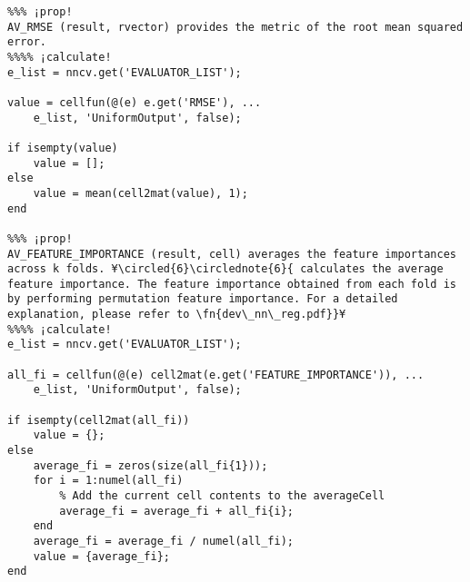 \documentclass{tufte-handout}
\begin{document}
\begin{lstlisting}
%%% ¡prop!
AV_RMSE (result, rvector) provides the metric of the root mean squared error. 
%%%% ¡calculate!
e_list = nncv.get('EVALUATOR_LIST');

value = cellfun(@(e) e.get('RMSE'), ...
    e_list, 'UniformOutput', false);

if isempty(value)
    value = [];
else
    value = mean(cell2mat(value), 1);
end

%%% ¡prop!
AV_FEATURE_IMPORTANCE (result, cell) averages the feature importances across k folds. ¥\circled{6}\circlednote{6}{ calculates the average feature importance. The feature importance obtained from each fold is by performing permutation feature importance. For a detailed explanation, please refer to \fn{dev\_nn\_reg.pdf}}¥
%%%% ¡calculate!
e_list = nncv.get('EVALUATOR_LIST');

all_fi = cellfun(@(e) cell2mat(e.get('FEATURE_IMPORTANCE')), ...
    e_list, 'UniformOutput', false);

if isempty(cell2mat(all_fi))
    value = {};
else
    average_fi = zeros(size(all_fi{1}));
    for i = 1:numel(all_fi)
        % Add the current cell contents to the averageCell
        average_fi = average_fi + all_fi{i};
    end
    average_fi = average_fi / numel(all_fi);
    value = {average_fi};
end
\end{lstlisting}
\end{document}
